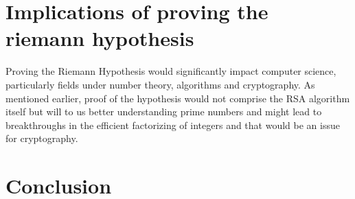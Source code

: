 \documentclass[12pt]{amsart} %
\theoremstyle{definition}
\theoremstyle{remark}
\numberwithin{equation}{section}
\begin{document}
\section{Implications of proving the riemann hypothesis}
Proving the Riemann Hypothesis would significantly impact computer science, particularly fields under number theory, algorithms and cryptography. As mentioned earlier, proof of the hypothesis would not comprise the RSA algorithm itself but will to us better understanding prime numbers and might lead to breakthroughs in the efficient factorizing of integers and that would be an issue for cryptography.

\section{Conclusion}




\end{document}
